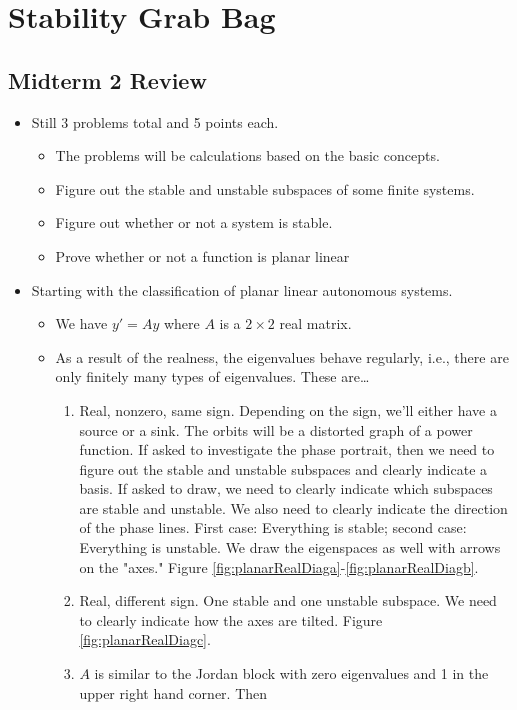 \documentclass[../notes.tex]{subfiles}
\begin{document}
\chapter{Stability Grab Bag}
\section{Midterm 2 Review}
\begin{itemize}
    \item {}Still 3 problems total and 5 points each.
    \begin{itemize}
        \item The problems will be calculations based on the basic concepts.
        \item Figure out the stable and unstable subspaces of some finite systems.
        \item Figure out whether or not a system is stable.
        \item Prove whether or not a function is planar linear
    \end{itemize}
    \item Starting with the classification of planar linear autonomous systems.
    \begin{itemize}
        \item We have $y'=Ay$ where $A$ is a $2\times 2$ real matrix.
        \item As a result of the realness, the eigenvalues behave regularly, i.e., there are only finitely many types of eigenvalues. These are\dots
        \begin{enumerate}
            \item Real, nonzero, same sign. Depending on the sign, we'll either have a source or a sink. The orbits will be a distorted graph of a power function. If asked to investigate the phase portrait, then we need to figure out the stable and unstable subspaces and clearly indicate a basis. If asked to draw, we need to clearly indicate which subspaces are stable and unstable. We also need to clearly indicate the direction of the phase lines. First case: Everything is stable; second case: Everything is unstable. We draw the eigenspaces as well with arrows on the "axes." Figure \ref{fig:planarRealDiaga}-\ref{fig:planarRealDiagb}.
            \item Real, different sign. One stable and one unstable subspace. We need to clearly indicate how the axes are tilted. Figure \ref{fig:planarRealDiagc}.
            \item $A$ is similar to the Jordan block with zero eigenvalues and 1 in the upper right hand corner. Then

\end{enumerate}
\end{itemize}
\end{itemize}
\end{document}
